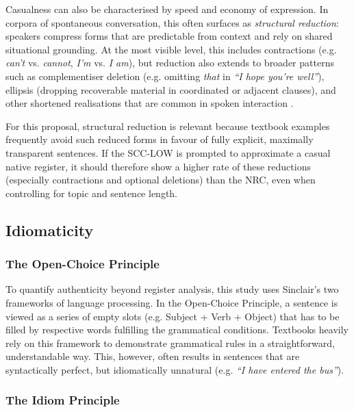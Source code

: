 Casualness can also be characterised by speed and economy of expression. In corpora of spontaneous conversation, this often surfaces as \textit{structural reduction}: speakers compress forms that are predictable from context and rely on shared situational grounding. At the most visible level, this includes contractions (e.g. \textit{can't} vs. \textit{cannot}, \textit{I'm} vs. \textit{I am}), but reduction also extends to broader patterns such as complementiser deletion (e.g. omitting \textit{that} in \textit{``I hope you're well''}), ellipsis (dropping recoverable material in coordinated or adjacent clauses), and other shortened realisations that are common in spoken interaction \parencite{biber1999longman}.

For this proposal, structural reduction is relevant because textbook examples frequently avoid such reduced forms in favour of fully explicit, maximally transparent sentences. If the SCC-LOW is prompted to approximate a casual native register, it should therefore show a higher rate of these reductions (especially contractions and optional deletions) than the NRC, even when controlling for topic and sentence length.

\subsection{Idiomaticity} 

\subsubsection{The Open-Choice Principle}
    
To quantify authenticity beyond register analysis, this study uses Sinclair's \parencite*{sinclairCorpusConcordanceCollocation1991} two frameworks of language processing. In the Open-Choice Principle, a sentence is viewed as a series of empty slots (e.g. Subject + Verb + Object) that has to be filled by respective words fulfilling the grammatical conditions. Textbooks heavily rely on this framework to demonstrate grammatical rules in a straightforward, understandable way. This, however, often results in sentences that are syntactically perfect, but idiomatically unnatural (e.g. \textit{``I have entered the bus''}). 
    
\subsubsection{The Idiom Principle}

